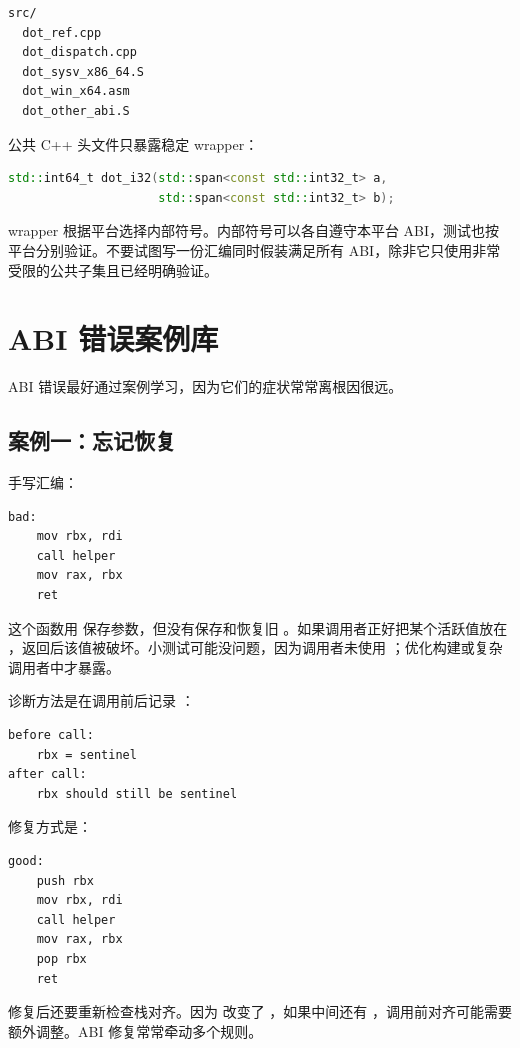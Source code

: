 \begin{lstlisting}
src/
  dot_ref.cpp
  dot_dispatch.cpp
  dot_sysv_x86_64.S
  dot_win_x64.asm
  dot_other_abi.S
\end{lstlisting}

公共 C++ 头文件只暴露稳定 wrapper：

\begin{lstlisting}[language=C++]
std::int64_t dot_i32(std::span<const std::int32_t> a,
                     std::span<const std::int32_t> b);
\end{lstlisting}

wrapper 根据平台选择内部符号。内部符号可以各自遵守本平台 ABI，测试也按平台分别验证。不要试图写一份汇编同时假装满足所有 ABI，除非它只使用非常受限的公共子集且已经明确验证。

\section{ABI 错误案例库}

ABI 错误最好通过案例学习，因为它们的症状常常离根因很远。

\subsection{案例一：忘记恢复 }

手写汇编：

\begin{lstlisting}
bad:
    mov rbx, rdi
    call helper
    mov rax, rbx
    ret
\end{lstlisting}

这个函数用  保存参数，但没有保存和恢复旧 。如果调用者正好把某个活跃值放在 ，返回后该值被破坏。小测试可能没问题，因为调用者未使用 ；优化构建或复杂调用者中才暴露。

诊断方法是在调用前后记录 ：

\begin{lstlisting}
before call:
    rbx = sentinel
after call:
    rbx should still be sentinel
\end{lstlisting}

修复方式是：

\begin{lstlisting}
good:
    push rbx
    mov rbx, rdi
    call helper
    mov rax, rbx
    pop rbx
    ret
\end{lstlisting}

修复后还要重新检查栈对齐。因为  改变了 ，如果中间还有 ，调用前对齐可能需要额外调整。ABI 修复常常牵动多个规则。

